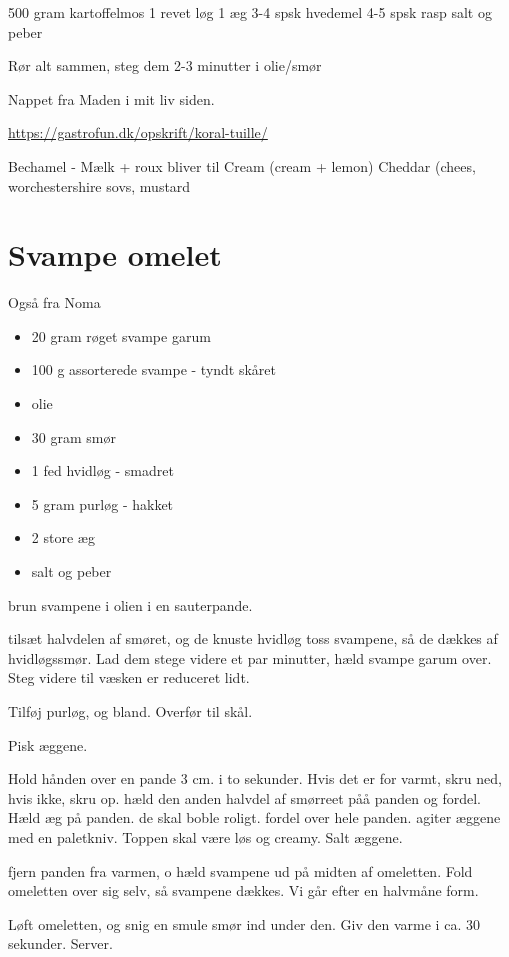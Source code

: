 \documentclass[
]{book}
\providecommand{\tightlist}{%
  \setlength{\itemsep}{0pt}\setlength{\parskip}{0pt}}
\begin{document}
500 gram kartoffelmos
1 revet løg
1 æg
3-4 spsk hvedemel
4-5 spsk rasp
salt og peber

Rør alt sammen, steg dem 2-3 minutter i olie/smør

Nappet fra Maden i mit liv siden.

\url{https://gastrofun.dk/opskrift/koral-tuille/}

Bechamel - Mælk + roux
bliver til
Cream (cream + lemon)
Cheddar (chees, worchestershire sovs, mustard

\section{Svampe omelet}\label{svampe-omelet}

Også fra Noma

\begin{itemize}
\tightlist
\item
  20 gram røget svampe garum
\item
  100 g assorterede svampe - tyndt skåret
\item
  olie
\item
  30 gram smør
\item
  1 fed hvidløg - smadret
\item
  5 gram purløg - hakket
\item
  2 store æg
\item
  salt og peber
\end{itemize}

brun svampene i olien i en sauterpande.

tilsæt halvdelen af smøret, og de knuste hvidløg
toss svampene, så de dækkes af hvidløgssmør.
Lad dem stege videre et par minutter, hæld svampe garum over. Steg videre til væsken er reduceret lidt.

Tilføj purløg, og bland. Overfør til skål.

Pisk æggene.

Hold hånden over en pande 3 cm. i to sekunder. Hvis det er for varmt, skru ned, hvis ikke, skru op.
hæld den anden halvdel af smørreet påå panden og fordel.
Hæld æg på panden. de skal boble roligt. fordel over hele panden. agiter æggene med en paletkniv.
Toppen skal være løs og creamy. Salt æggene.

fjern panden fra varmen, o hæld svampene ud på midten af omeletten.
Fold omeletten over sig selv, så svampene dækkes. Vi går efter en halvmåne form.

Løft omeletten, og snig en smule smør ind under den. Giv den varme i ca. 30 sekunder. Server.
\end{document}

